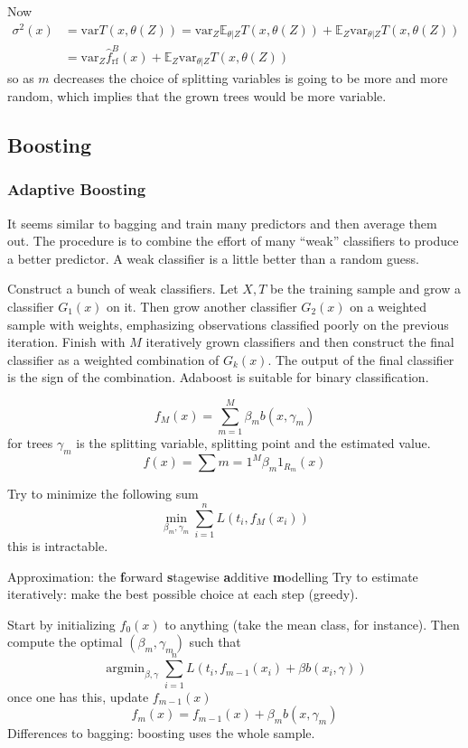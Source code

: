 \documentclass[a4paper]{article}
\newcommand{\ex}{\mathbb{E}}
\newcommand{\var}[0]{{\text{var}}}
\newcommand{\argmin}{\mathop{\text{argmin}}}
\begin{document}
Now
\begin{align*}
	\sigma^2(x)
	&= \var T(x,\theta(Z))
	= \var_Z \ex_{\theta|Z} T(x,\theta(Z)) + \ex_Z \var_{\theta|Z} T(x,\theta(Z)) \\
	&= \var_Z \hat{f}^B_{\text{rf}}(x) + \ex_Z \var_{\theta|Z} T(x,\theta(Z))
\end{align*}
so as $m$ decreases the choice of splitting variables is going to be more and more random,
which implies that the grown trees would be more variable.


\subsection{Boosting} %
\label{sub:boosting}

\subsubsection{\textbf{Ada}ptive \textbf{Boost}ing} %
\label{ssub:adaboost}

It seems similar to bagging and train many predictors and then average them out.
The procedure is to combine the effort of many ``weak'' classifiers to produce a
better predictor. A weak classifier is a little better than a random guess.

Construct a bunch of weak classifiers. Let $X,T$ be the training sample and grow a
classifier $G_1(x)$ on it. Then grow another classifier $G_2(x)$ on a weighted sample
with weights, emphasizing observations classified poorly on the previous iteration.
Finish with $M$ iteratively grown classifiers and then construct the final classifier
as a weighted combination of $G_k(x)$. The output of the final classifier is the sign
of the combination. Adaboost is suitable for binary classification.

\[f_M(x) = \sum_{m=1}^M \beta_m b(x,\gamma_m)\]
for trees $\gamma_m$ is the splitting variable, splitting point and the estimated value.
\[f(x) = \sum{m=1}^M \beta_m 1_{R_m}(x)\]
 
Try to minimize the following sum
\[ \min_{\beta_m, \gamma_m} \sum_{i=1}^n L(t_i, f_M(x_i) ) \]
this is intractable.

Approximation: the \textbf{f}orward \textbf{s}tagewise \textbf{a}dditive \textbf{m}odelling
Try to estimate iteratively: make the best possible choice at each step (greedy).

Start by initializing $f_0(x)$ to anything (take the mean class, for instance).
Then compute the optimal $(\beta_m,\gamma_m)$ such that 
\[\argmin_{\beta, \gamma} \sum_{i=1}^n L(t_i,f_{m-1}(x_i) + \beta b(x_i, \gamma))\]
once one has this, update $f_{m-1}(x)$
\[
f_m(x) = f_{m-1}(x) + \beta_m b(x, \gamma_m)
\]
Differences to bagging: boosting uses the whole sample.
\end{document}
